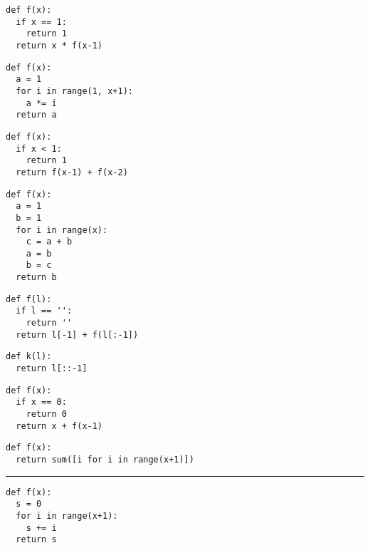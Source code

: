\documentclass[12pt,a4paper]{article}
\begin{document}
\pagestyle{empty}
\noindent

\begin{multicols}{2}

\begin{lstlisting}
def f(x):
  if x == 1:
    return 1
  return x * f(x-1)
\end{lstlisting}

\begin{lstlisting}
def f(x):
  a = 1
  for i in range(1, x+1):
    a *= i
  return a
\end{lstlisting}

\begin{lstlisting}
def f(x):
  if x < 1:
    return 1
  return f(x-1) + f(x-2)
\end{lstlisting}

\begin{lstlisting}
def f(x):
  a = 1
  b = 1
  for i in range(x):
    c = a + b
    a = b
    b = c
  return b
\end{lstlisting}

\begin{lstlisting}
def f(l):
  if l == '':
    return ''
  return l[-1] + f(l[:-1])
\end{lstlisting}

\begin{lstlisting}
def k(l):
  return l[::-1]
\end{lstlisting}

\begin{lstlisting}
def f(x):
  if x == 0:
    return 0
  return x + f(x-1)
\end{lstlisting}

\begin{lstlisting}
def f(x):
  return sum([i for i in range(x+1)])
\end{lstlisting}

\rule{\linewidth}{1pt}

\begin{lstlisting}
def f(x):
  s = 0
  for i in range(x+1):
    s += i
  return s
\end{lstlisting}

\end{multicols}
\end{document}
